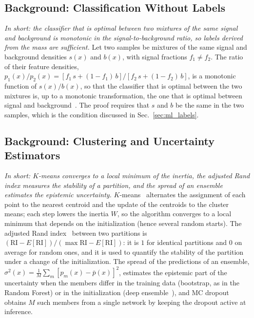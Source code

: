 \subsection{Background: Classification Without Labels}
\emph{In short: the classifier that is optimal between two mixtures of the same signal and background is monotonic in the signal-to-background ratio, so labels derived from the mass are sufficient.}
Let two samples be mixtures of the same signal and background densities $s(x)$ and $b(x)$, with signal fractions $f_1\neq f_2$. The ratio of their feature densities, $p_1(x)/p_2(x)=[f_1\,s+(1-f_1)\,b]/[f_2\,s+(1-f_2)\,b]$, is a monotonic function of $s(x)/b(x)$, so that the classifier that is optimal between the two mixtures is, up to a monotonic transformation, the one that is optimal between signal and background~\cite{cwola}. The proof requires that $s$ and $b$ be the same in the two samples, which is the condition discussed in Sec.~\ref{sec:ml_labels}.
\subsection{Background: Clustering and Uncertainty Estimators}
\emph{In short: $K$-means converges to a local minimum of the inertia, the adjusted Rand index measures the stability of a partition, and the spread of an ensemble estimates the epistemic uncertainty.}
$K$-means~\cite{lloyd_kmeans} alternates the assignment of each point to the nearest centroid and the update of the centroids to the cluster means; each step lowers the inertia $W$, so the algorithm converges to a local minimum that depends on the initialization (hence several random starts). The adjusted Rand index~\cite{hubert_ari} between two partitions is $(\mathrm{RI}-E[\mathrm{RI}])/(\max\mathrm{RI}-E[\mathrm{RI}])$: it is $1$ for identical partitions and $0$ on average for random ones, and it is used to quantify the stability of the partition under a change of the initialization. The spread of the predictions of an ensemble, $\sigma^2(x)=\frac1M\sum_m[p_m(x)-\bar p(x)]^2$, estimates the epistemic part of the uncertainty when the members differ in the training data (bootstrap, as in the Random Forest) or in the initialization (deep ensemble~\cite{deep_ensembles}), and MC dropout~\cite{gal_mcdropout} obtains $M$ such members from a single network by keeping the dropout active at inference.
